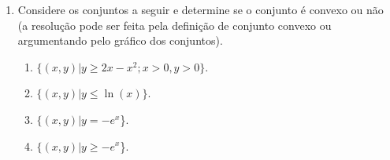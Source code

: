 \documentclass[preprintnumbers,nofootinbib,amsmath,amssymb,12pt]{article}
\begin{document}
\begin{enumerate}
    \item Considere os conjuntos a seguir e determine se o conjunto é convexo ou não (a resolução pode ser feita pela definição de conjunto convexo ou argumentando pelo gráfico dos conjuntos).
    \begin{enumerate}
        \item $\{(x,y)|y\geq 2x-x^2; x>0, y>0\}$.
        \item $\{(x,y)|y\leq \ln(x)\}$.
        \item $\{(x,y)| y = -e^x$\}.
        \item $\{(x,y)| y \geq -e^x$\}.
    \end{enumerate}
    \end{enumerate}
\end{document}
